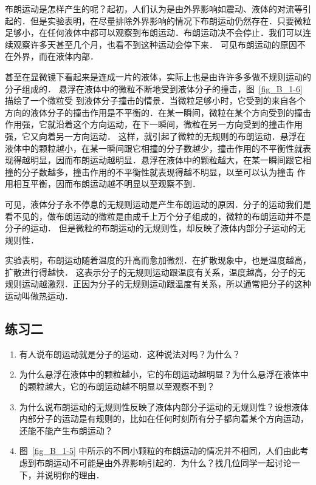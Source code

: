 布朗运动是怎样产生的呢？起初，人们认为是由外界影响如震动、液体的对流等引起的．但是实验表明，在尽量排除外界影响的情况下布朗运动仍然存在．只要微粒足够小，在任何液体中都可以观察到布朗运动．布朗运动决不会停止．我们可以连续观察许多天甚至几个月，也看不到这种运动会停下来．
可见布朗运动的原因不在外界，而在液体内部．

甚至在显微镜下看起来是连成一片的液体，实际上也是由许许多多做不规则运动的分子组成的．
悬浮在液体中的微粒不断地受到液体分子的撞击，图~\ref{fig_B_1-6} 描绘了一个微粒受
到液体分子撞击的情景．当微粒足够小时，它受到的来自各个方向的液体分子的撞击作用是不平衡的．在某一瞬间，微粒在某个方向受到的撞击作用强，它就沿着这个方向运动，在下一瞬间，微粒在另一方向受到的撞击作用强，它又向着另一方向运动．
这样，就引起了微粒的无规则的布朗运动．悬浮在液体中的颗粒越小，在某一瞬间跟它相撞的分子数越少，撞击作用的不平衡性就表现得越明显，因而布朗运动越明显．悬浮在液体中的颗粒越大，在某一瞬间跟它相撞的分子数越多，撞击作用的不平衡性就表现得越不明显，以至可以认为撞击
作用相互平衡，因而布朗运动越不明显以至观察不到．

可见，液体分子永不停息的无规则运动是产生布朗运动的原因．分子的运动我们是看不见的，做布朗运动的微粒是由成千上万个分子组成的，微粒的布朗运动并不是分子的运动．
但是微粒的布朗运动的无规则性，却反映了液体内部分子运动的无规则性．

实验表明，布朗运动随着温度的升高而愈加微烈．在扩散现象中，也是温度越高，扩散进行得越快．
这表示分子的无规则运动跟温度有关系，温度越高，分子的无规则运动越激烈．正因为分子的无规则运动跟温度有关系，所以通常把分子的这种运动叫做热运动．


\subsection*{练习二}
\begin{enumerate}
\item 有人说布朗运动就是分子的运动．这种说法对吗？为什么？
\item 为什么悬浮在液体中的颗粒越小，它的布朗运动越明显？为什么悬浮在液体中的颗粒越大，它的布朗运动越不明显以至观察不到？
\item 为什么说布朗运动的无规则性反映了液体内部分子运动的无规则性？设想液体内部分子的运动是有规则的，比如在任何时刻所有分子都向着某个方向运动，还能不能产生布朗运动？
\item  图~\ref{fig_B_1-5} 中所示的不同小颗粒的布朗运动的情况并不相同，人们由此考虑到布朗运动不可能是由外界影响引起的．为什么？找几位同学一起讨论一下，并说明你的理由．
\end{enumerate}

